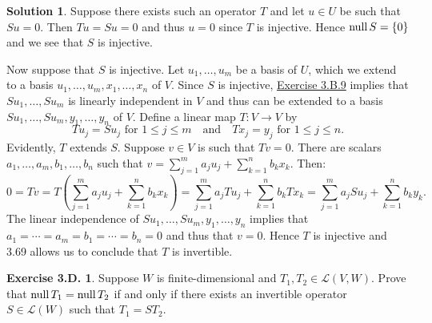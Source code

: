 \documentclass[12pt]{article}
\theoremstyle{definition}
\theoremstyle{exercise}
\newtheorem{exercise}{Exercise 3.D.}
\theoremstyle{solution}
\newtheorem*{solution}{Solution}
\newcommand{\lmap}{\mathcal{L}}
\newcommand{\Null}{\text{null\,}}
\newcommand{\quand}{\quad \text{and} \quad}
\begin{document}
\begin{solution}
    Suppose there exists such an operator \( T \) and let \( u \in U \) be such that \( Su = 0 \). Then \( Tu = Su = 0 \) and thus \( u = 0 \) since \( T \) is injective. Hence \( \Null S = \{ 0 \} \) and we see that \( S \) is injective.

    Now suppose that \( S \) is injective. Let \( u_1, \ldots, u_m \) be a basis of \( U \), which we extend to a basis \( u_1, \ldots, u_m, x_1, \ldots, x_n \) of \( V \). Since \( S \) is injective, \href{https://lew98.github.io/Mathematics/LADR_Section_3_B_Exercises.pdf}{Exercise 3.B.9} implies that \( Su_1, \ldots, Su_m \) is linearly independent in \( V \) and thus can be extended to a basis \( Su_1, \ldots, Su_m, y_1, \ldots, y_n \) of \( V \). Define a linear map \( T : V \to V \) by
    \[
        Tu_j = Su_j \text{ for } 1 \leq j \leq m \quand Tx_j = y_j \text{ for } 1 \leq j \leq n.
    \]
    Evidently, \( T \) extends \( S \). Suppose \( v \in V \) is such that \( Tv = 0 \). There are scalars \( a_1, \ldots, a_m, b_1, \ldots, b_n \) such that \( v = \sum_{j=1}^m a_j u_j + \sum_{k=1}^n b_k x_k \). Then:
    \[
        0 = Tv = T \left( \sum_{j=1}^m a_j u_j + \sum_{k=1}^n b_k x_k \right) = \sum_{j=1}^m a_j Tu_j + \sum_{k=1}^n b_k Tx_k = \sum_{j=1}^m a_j Su_j + \sum_{k=1}^n b_k y_k.
    \]
    The linear independence of \( Su_1, \ldots, Su_m, y_1, \ldots, y_n \) implies that \( a_1 = \cdots = a_m = b_1 = \cdots = b_n = 0 \) and thus that \( v = 0 \). Hence \( T \) is injective and 3.69 allows us to conclude that \( T \) is invertible.
\end{solution}

\begin{exercise}
\label{ex:4}
    Suppose \( W \) is finite-dimensional and \( T_1, T_2 \in \lmap(V, W) \). Prove that \( \Null T_1 = \Null T_2 \) if and only if there exists an invertible operator \( S \in \lmap(W) \) such that \( T_1 = ST_2 \).
\end{exercise}
\end{document}

